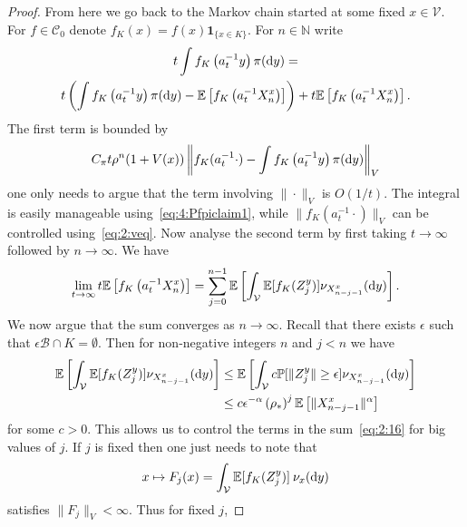 \documentclass[preprint,12pt]{elsarticle}
\theoremstyle{definition}
\theoremstyle{remark}
\newcommand{\xbf}{{ x}}
\newcommand{\ybf}{{ y}}
\newcommand{\Xbf}{{ X}}
\newcommand{\Zbf}{{ Z}}
\newcommand{\1}{{\mathbf 1}}
\numberwithin{equation}{section}
\newcommand{\Ebb}{\mathbb{E}}  %
\newcommand{\Nbb}{\mathbb{N}}
\newcommand{\Pbb}{\mathbb{P}}
\newcommand{\ud}{{\rm d}}
\newcommand{\Vcal}{\mathcal{V}}
\newcommand{\Bcal}{\mathcal{B}}
\newcommand{\Ccal}{\mathcal{C}}
\begin{document}
\begin{proof}
	From here we go back to the Markov chain started at some fixed $\xbf \in \Vcal$.
	For $f \in \Ccal_0$ denote $f_K(x) = f(x)\mathbf{1}_{\{ x \in K \}}$. 
    For $n \in \Nbb$ write
	\begin{multline*}
		t \int f_K\left(a_t^{-1} \ybf \right) \pi(\ud \ybf) = \\
		t \left(\int f_K\left(a_t^{-1} \ybf \right) \pi(\ud \ybf) - 
		 \Ebb\left[ f_K \left( a_t^{-1} \Xbf_n^\xbf  \right) \right] \right)
		+t \Ebb \left[ f_K \left( a_t^{-1} \Xbf_n^\xbf  \right) \right].
	\end{multline*}
	The first term is bounded by
	\begin{equation*}
		C_{\pi} t \rho^n (1+V(\xbf)) \left\| f_K(a_t^{-1} \cdot) - 
		\int f_K\left(a_t^{-1} \ybf \right) \pi(\ud \ybf)
		\right\|_V
	\end{equation*}
	one only needs to argue that the term involving $\|\cdot\|_V$ is $O(1/t)$.
	The integral is easily manageable using~\eqref{eq:4:Pfpiclaim1}, 
    while $\|f_K(a_t^{-1} \cdot)\|_V$ 
	can be controlled using~\eqref{eq:2:veq}.
	Now analyse the second term by first taking $t \to \infty$ followed by $n \to \infty$. 
	We have
	\begin{equation}\label{eq:2:16}
		\lim_{t \to \infty}
		t \Ebb \left[ f_K \left( a_t^{-1} \Xbf_n^\xbf  \right) \right]= 
		\sum_{j=0}^{n-1} \Ebb \left[ \int_\Vcal 
        \Ebb[f_K(\Zbf_j^\ybf) ] \nu_{\Xbf_{n-j-1}^\xbf } (\ud y) \right].
	\end{equation}
	We now argue that the sum converges as $n \to \infty$. 
    	Recall that there exists $\epsilon$ such that $\epsilon \Bcal \cap K =\emptyset$. Then
    	for non-negative integers $n$ and $j <n$ we have
	\begin{align*}
		\Ebb \left[ \int_\Vcal \Ebb[f_K(\Zbf_j^\ybf) ] 
        \nu_{\Xbf_{n-j-1}^\xbf } (\ud y) \right]& \leq 
		\Ebb \left[ \int_\Vcal c \Pbb[ \|\Zbf_j^\ybf\| \geq \epsilon ] 
        \nu_{\Xbf_{n-j-1}^\xbf } (\ud y) \right] \\
		& \leq c \epsilon^{-\alpha} \left( \rho_* \right)^j 
        \mathbb{E}\left[\|\Xbf_{n-j-1}^\xbf\|^\alpha\right]
	\end{align*}
    for some $c>0$.
	This allows us to control the terms in the sum~\eqref{eq:2:16} for big values of $j$. 
	If $j$ is fixed then one just needs to note that
	\begin{equation*}
		\xbf \mapsto F_j(\xbf) = \int_\Vcal \Ebb[f_K (\Zbf_j^\ybf)] \: \nu_\xbf(\ud \ybf) 
	\end{equation*}
	satisfies $\|F_j \|_V <\infty$. Thus for fixed $j$,

\end{proof}
\end{document}
